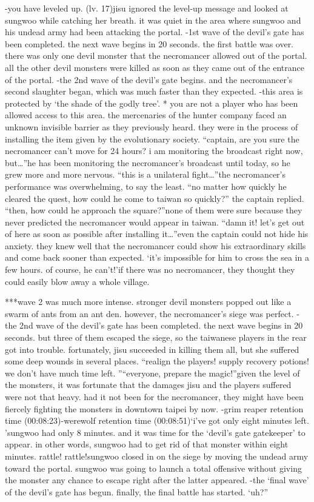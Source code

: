 -you have leveled up.
 (lv.
 17)jisu ignored the level-up message and looked at sungwoo while catching her breath.
it was quiet in the area where sungwoo and his undead army had been attacking the portal.
-1st wave of the devil’s gate has been completed.
 the next wave begins in 20 seconds.
the first battle was over.
 there was only one devil monster that the necromancer allowed out of the portal.
 all the other devil monsters were killed as soon as they came out of the entrance of the portal.
-the 2nd wave of the devil’s gate begins.
and the necromancer’s second slaughter began, which was much faster than they expected.
-this area is protected by ‘the shade of the godly tree’.
* you are not a player who has been allowed access to this area.
the mercenaries of the hunter company faced an unknown invisible barrier as they previously heard.
 they were in the process of installing the item given by the evolutionary society.
“captain, are you sure the necromancer can’t move for 24 hours? i am monitoring the broadcast right now, but…”he has been monitoring the necromancer’s broadcast until today, so he grew more and more nervous.
“this is a unilateral fight…”the necromancer’s performance was overwhelming, to say the least.
“no matter how quickly he cleared the quest, how could he come to taiwan so quickly?” the captain replied.
“then, how could he approach the square?”none of them were sure because they never predicted the necromancer would appear in taiwan.
“damn it! let’s get out of here as soon as possible after installing it…”even the captain could not hide his anxiety.
 they knew well that the necromancer could show his extraordinary skills and come back sooner than expected.
‘it’s impossible for him to cross the sea in a few hours.
 of course, he can’t!’if there was no necromancer, they thought they could easily blow away a whole village.


***wave 2 was much more intense.
 stronger devil monsters popped out like a swarm of ants from an ant den.
 however, the necromancer’s siege was perfect.
-the 2nd wave of the devil’s gate has been completed.
 the next wave begins in 20 seconds.
but three of them escaped the siege, so the taiwanese players in the rear got into trouble.
fortunately, jisu succeeded in killing them all, but she suffered some deep wounds in several places.
“realign the players! supply recovery potions! we don’t have much time left.
”“everyone, prepare the magic!”given the level of the monsters, it was fortunate that the damages jisu and the players suffered were not that heavy.
had it not been for the necromancer, they might have been fiercely fighting the monsters in downtown taipei by now.
-grim reaper retention time (00:08:23)-werewolf retention time (00:08:51)‘i’ve got only eight minutes left.
’sungwoo had only 8 minutes.
 and it was time for the ‘devil’s gate gatekeeper’ to appear.
 in other words, sungwoo had to get rid of that monster within eight minutes.
rattle! rattle!sungwoo closed in on the siege by moving the undead army toward the portal.
 sungwoo was going to launch a total offensive without giving the monster any chance to escape right after the latter appeared.
-the ‘final wave’ of the devil’s gate has begun.
finally, the final battle has started.
‘uh?”

 